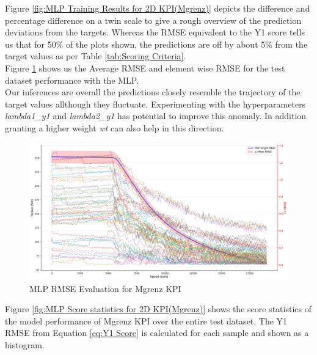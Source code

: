 \documentclass{report} %
\begin{document}
Figure \ref{fig:MLP Training Results for 2D KPI(Mgrenz)} depicts the difference and percentage difference on a twin scale to give a rough overview of the prediction deviations from the targets.
Whereas the \ac{RMSE} equivalent to the Y1 score tells us that for 50\% of the plots shown, the predictions are off by about 5\% from the target values as per Table \ref{tab:Scoring Criteria}.\\
Figure \ref{fig:MLP RMSE Evaluation for 2D KPI(Mgrenz)} shows us the Average \ac{RMSE} and element wise \ac{RMSE} for the test dataset performance with the \ac{MLP}. \\
Our inferences are overall the predictions closely resemble the trajectory of the target values allthough they fluctuate.
Experimenting with the hyperparameters \textit{lambda1\_y1} and \textit{lambda2\_y1} has potential to improve this anomaly. 
In addition granting a higher weight \textit{wt} can also help in this direction.\\
\begin{figure}[H]
    \centering
    \includegraphics[width=1\textwidth]{./ReportImages/RMSE_MLP_y1.png} 
    \caption{\ac{MLP} \ac{RMSE} Evaluation for Mgrenz \ac{KPI}} 
    \label{fig:MLP RMSE Evaluation for 2D KPI(Mgrenz)}
\end{figure}


Figure \ref{fig:MLP Score statistics for 2D KPI(Mgrenz)} shows the score statistics of the model performance of Mgrenz \ac{KPI} over the entire test dataset.
The Y1 \ac{RMSE} from Equation \ref{eq:Y1 Score} is calculated for each sample and shown as a histogram.\\
\end{document}
